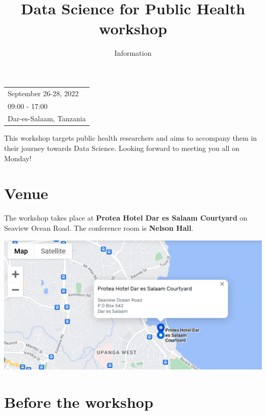 \documentclass[
  letterpaper,
  DIV=11,
  numbers=noendperiod]{scrartcl}
\title{Data Science for Public Health workshop}
\subtitle{Information}
\author{}
\date{}
\begin{document}
\maketitle
\ifdefined\Shaded\renewenvironment{Shaded}{\begin{tcolorbox}[boxrule=0pt, enhanced, interior hidden, sharp corners, frame hidden, borderline west={3pt}{0pt}{shadecolor}, breakable]}{\end{tcolorbox}}\fi

\begin{longtable}[]{@{}l@{}}
\toprule()
\endhead
September 26-28, 2022 \\
09:00 - 17:00 \\
Dar-es-Salaam, Tanzania \\
\bottomrule()
\end{longtable}

This workshop targets public health researchers and aims to accompany
them in their journey towards Data Science. Looking forward to meeting
you all on Monday!

\hypertarget{venue}{%
\section{Venue}\label{venue}}

The workshop takes place at \textbf{Protea Hotel Dar es Salaam
Courtyard} on Seaview Ocean Road. The conference room is \textbf{Nelson
Hall}.

\includegraphics{images/paste-67B4C38F.png}

\hypertarget{before-the-workshop}{%
\section{Before the workshop}\label{before-the-workshop}}
\end{document}
